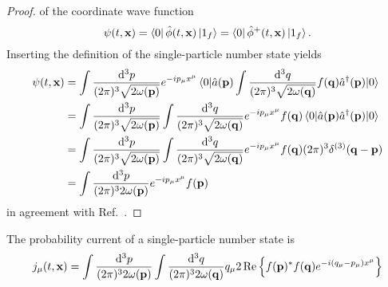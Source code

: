 \qkgsinglewavefunction
\begin{proof}
	of the coordinate wave function
	\begin{equation*}
		\psi(t,\vb{x})
		=
		\bra{0}
		\hat\phi(t,\vb{x})
		\ket{1_f}
		=
		\bra{0}
		\hat\phi^+(t,\vb{x})
		\ket{1_f}
		.
	\end{equation*}
	Inserting the definition of the single-particle number state yields
	\begin{equation*}
		\begin{split}
			\psi(t,\vb{x})
			&=
			\int\frac{\dd[3]{p}}{(2\pi)^3\sqrt{2\omega(\vb{p})}}
			e^{-ip_\mu x^\mu}
			\expval{
				\hat{a}(\vb{p})
				\int\frac{\dd[3]{q}}{(2\pi)^3\sqrt{2\omega(\vb{q})}}
				f(\vb{q})
				\hat{a}^\dagger(\vb{p})
			}{0}
			\\
			&=
			\int\frac{\dd[3]{p}}{(2\pi)^3\sqrt{2\omega(\vb{p})}}
			\int\frac{\dd[3]{q}}{(2\pi)^3\sqrt{2\omega(\vb{q})}}
			e^{-ip_\mu x^\mu}
			f(\vb{q})
			\expval{
				\hat{a}(\vb{p})
				\hat{a}^\dagger(\vb{p})
			}{0}
			\\
			&=
			\int\frac{\dd[3]{p}}{(2\pi)^3\sqrt{2\omega(\vb{p})}}
			\int\frac{\dd[3]{q}}{(2\pi)^3\sqrt{2\omega(\vb{q})}}
			e^{-ip_\mu x^\mu}
			f(\vb{q})
			(2\pi)^3
			\delta^{(3)}(\vb{q}-\vb{p})
			\\
			&=
			\int\frac{\dd[3]{p}}{(2\pi)^32\omega(\vb{p})}
			e^{-ip_\mu x^\mu}
			f(\vb{p})
		\end{split}
	\end{equation*}
	in agreement with Ref.~\cite[eq.~4]{Naumov2013}.
\end{proof}
\begin{lemma}
	The probability current of a single-particle number state is
	\begin{equation}
		j_\mu(t,\vb{x})
		=
		\int\frac{\dd[3]{p}}{(2\pi)^32\omega(\vb{p})}
		\int\frac{\dd[3]{q}}{(2\pi)^32\omega(\vb{q})}
		q_\mu
		2\operatorname{\operatorname{Re}}\left\{
			f(\vb{p})^*
			f(\vb{q})
			e^{-i(q_\mu-p_\mu)x^\mu}
		\right\}
	\end{equation}
\end{lemma}
\qkgsinglegroupvelocity
